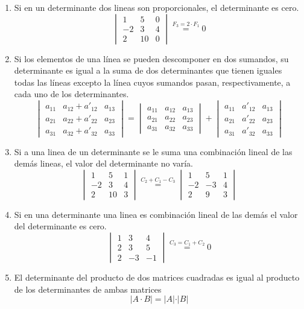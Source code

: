 \begin{enumerate}
\item Si en un determinante dos lineas son proporcionales, el determinante es cero.
\[ \begin{vmatrix}
1&5&0\\
-2&3 &4\\
2&10& 0
\end{vmatrix} \stackrel{F_{3}=2 \cdot F_{1}}{=}0 \]

\item Si los elementos de una línea se pueden descomponer en dos sumandos,  su determinante es igual a la suma de dos determinantes que tienen iguales todas las líneas excepto la línea cuyos sumandos pasan, respectivamente, a cada uno de los determinantes. 
\[ \begin{vmatrix}
a_{11}& a_{12}+ a'_{12} &a_{13} \\
a_{21} & a_{22}+a'_{22}&a_{23}\\
a_{31} & a_{32}+a'_{32}&a_{33}
\end{vmatrix}=\begin{vmatrix}
a_{11}& a_{12} &a_{13} \\
a_{21} & a_{22}&a_{23}\\
a_{31} & a_{32}&a_{33}
\end{vmatrix}+\begin{vmatrix}
a_{11}&  a'_{12} &a_{13} \\
a_{21} & a'_{22}&a_{23}\\
a_{31} & a'_{32}&a_{33}
\end{vmatrix} \]

\item Si a una linea de un determinante se le suma una combinación lineal de las demás lineas, el valor del determinante no varía.
\[ \begin{vmatrix}
1&5&1\\
-2&3 &4\\
2&10& 3
\end{vmatrix} \stackrel{C_{2}+C_{1}-C_{3}}{=}\begin{vmatrix}
1&5&1\\
-2&-3 &4\\
2&9& 3
\end{vmatrix} \]

\item Si en una determinante una linea es combinación lineal de las demás el valor del determinante es cero.
\[ \begin{vmatrix}
1&3&4\\
2&3 &5\\
2&-3&-1
\end{vmatrix} \stackrel{C_{3}=C_{1}+C_{2}}{=}0 \]

\item El determinante del producto de dos matrices cuadradas es igual al producto de los determinantes de ambas matrices 
\[ \vert A \cdot B\vert=\vert A \vert\cdot \vert B\vert  \]

\end{enumerate}

